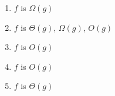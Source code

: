 \documentclass[11pt]{article}
\begin{document}
\begin{enumerate}
    \item $f$ is $\Omega(g)$
    \item $f$ is $\Theta(g)$, $\Omega(g)$, $O(g)$
    \item $f$ is $O(g)$
    \item $f$ is $O(g)$
    \item $f$ is $\Theta(g)$
\end{enumerate}
\end{document}
